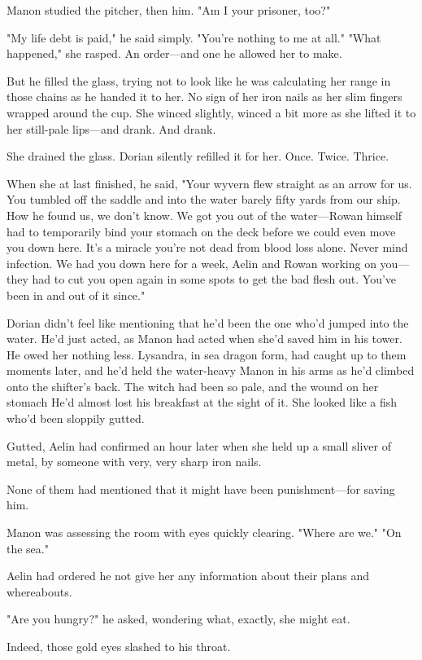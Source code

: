 Manon studied the pitcher, then him. "Am I your prisoner, too?"

"My life debt is paid," he said simply. "You're nothing to me at all." "What happened," she rasped. An order---and one he allowed her to make.

But he filled the glass, trying not to look like he was calculating her range in those chains as he handed it to her. No sign of her iron nails as her slim fingers wrapped around the cup. She winced slightly, winced a bit more as she lifted it to her still-pale lips---and drank. And drank.

She drained the glass. Dorian silently refilled it for her. Once. Twice. Thrice.

When she at last finished, he said, "Your wyvern flew straight as an arrow for us. You tumbled off the saddle and into the water barely fifty yards from our ship. How he found us, we don't know. We got you out of the water---Rowan himself had to temporarily bind your stomach on the deck before we could even move you down here. It's a miracle you're not dead from blood loss alone. Never mind infection. We had you down here for a week, Aelin and Rowan working on you---they had to cut you open again in some spots to get the bad flesh out. You've been in and out of it since."

Dorian didn't feel like mentioning that he'd been the one who'd jumped into the water. He'd just  acted, as Manon had acted when she'd saved him in his tower. He owed her nothing less. Lysandra, in sea dragon form, had caught up to them moments later, and he'd held the water-heavy Manon in his arms as he'd climbed onto the shifter's back. The witch had been so pale, and the wound on her stomach  He'd almost lost his breakfast at the sight of it. She looked like a fish who'd been sloppily gutted.

Gutted, Aelin had confirmed an hour later when she held up a small sliver of metal, by someone with very, very sharp iron nails.

None of them had mentioned that it might have been punishment---for saving him.

Manon was assessing the room with eyes quickly clearing. "Where are we." "On the sea."

Aelin had ordered he not give her any information about their plans and whereabouts.

"Are you hungry?" he asked, wondering what, exactly, she might eat.

Indeed, those gold eyes slashed to his throat.


